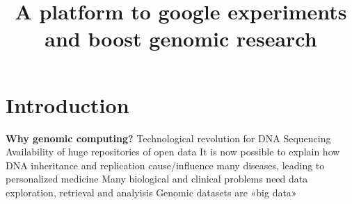 \documentclass[conference]{IEEEtran}
\begin{document}
\title{A platform to google experiments \\and boost genomic research}

\author{
}

\maketitle

\begin{abstract}


\end{abstract}



\IEEEpeerreviewmaketitle



\section{Introduction}
\label{sec:intro}
\textbf{Why genomic computing?}
Technological revolution for DNA Sequencing
Availability of huge repositories of open data
It is now possible to explain how DNA inheritance and replication cause/influence many diseases, leading to personalized medicine
Many biological and clinical problems need data exploration, retrieval and analyisis
Genomic datasets are «big data»
\end{document}
